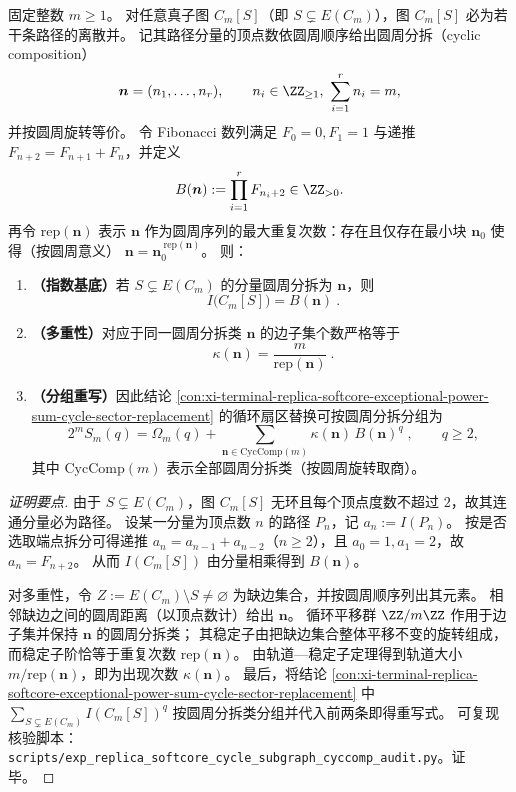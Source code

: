 \begin{conclusion}\label{con:xi-terminal-replica-softcore-cycle-subgraph-cyclic-composition-coeff-law}
固定整数 \(m\ge 1\)。
对任意真子图 \(C_m[S]\)（即 \(S\subsetneq E(C_m)\)），图 \(C_m[S]\) 必为若干条路径的离散并。
记其路径分量的顶点数依圆周顺序给出圆周分拆（cyclic composition）
\[
\boldsymbol n=(n_1,\dots,n_r),\qquad n_i\in\ZZ_{\ge 1},\ \sum_{i=1}^{r}n_i=m,
\]
并按圆周旋转等价。
令 Fibonacci 数列满足 \(F_0=0,F_1=1\) 与递推 \(F_{n+2}=F_{n+1}+F_n\)，并定义
\[
B(\boldsymbol n):=\prod_{i=1}^{r}F_{n_i+2}\in\ZZ_{>0}.
\]
再令 \(\mathrm{rep}(\boldsymbol n)\) 表示 \(\boldsymbol n\) 作为圆周序列的最大重复次数：存在且仅存在最小块 \(\boldsymbol n_0\) 使得（按圆周意义）
\(
\boldsymbol n=\boldsymbol n_0^{\ \mathrm{rep}(\boldsymbol n)}
\)。
则：
\begin{enumerate}
  \item \textbf{（指数基底）}若 \(S\subsetneq E(C_m)\) 的分量圆周分拆为 \(\boldsymbol n\)，则
  \[
  \boxed{\ I\!\bigl(C_m[S]\bigr)=B(\boldsymbol n)\ }.
  \]
  \item \textbf{（多重性）}对应于同一圆周分拆类 \(\boldsymbol n\) 的边子集个数严格等于
  \[
  \boxed{\ \kappa(\boldsymbol n)=\frac{m}{\mathrm{rep}(\boldsymbol n)}\ } .
  \]
  \item \textbf{（分组重写）}因此结论 \ref{con:xi-terminal-replica-softcore-exceptional-power-sum-cycle-sector-replacement} 的循环扇区替换可按圆周分拆分组为
  \[
  \boxed{\;
  2^m S_m(q)=\Omega_m(q)+\sum_{\boldsymbol n\in\mathrm{CycComp}(m)}\kappa(\boldsymbol n)\,B(\boldsymbol n)^{q}\; },
  \qquad q\ge 2,
  \]
  其中 \(\mathrm{CycComp}(m)\) 表示全部圆周分拆类（按圆周旋转取商）。
\end{enumerate}
\end{conclusion}
\begin{proof}[证明要点]
由于 \(S\subsetneq E(C_m)\)，图 \(C_m[S]\) 无环且每个顶点度数不超过 \(2\)，故其连通分量必为路径。
设某一分量为顶点数 \(n\) 的路径 \(P_n\)，记 \(a_n:=I(P_n)\)。
按是否选取端点拆分可得递推 \(a_n=a_{n-1}+a_{n-2}\)（\(n\ge 2\)），且 \(a_0=1,a_1=2\)，故 \(a_n=F_{n+2}\)。
从而 \(I(C_m[S])\) 由分量相乘得到 \(B(\boldsymbol n)\)。
\par
对多重性，令 \(Z:=E(C_m)\setminus S\neq\varnothing\) 为缺边集合，并按圆周顺序列出其元素。
相邻缺边之间的圆周距离（以顶点数计）给出 \(\boldsymbol n\)。
循环平移群 \(\ZZ/m\ZZ\) 作用于边子集并保持 \(\boldsymbol n\) 的圆周分拆类；
其稳定子由把缺边集合整体平移不变的旋转组成，而稳定子阶恰等于重复次数 \(\mathrm{rep}(\boldsymbol n)\)。
由轨道—稳定子定理得到轨道大小 \(m/\mathrm{rep}(\boldsymbol n)\)，即为出现次数 \(\kappa(\boldsymbol n)\)。
最后，将结论 \ref{con:xi-terminal-replica-softcore-exceptional-power-sum-cycle-sector-replacement} 中
\(\sum_{S\subsetneq E(C_m)}I(C_m[S])^{q}\)
按圆周分拆类分组并代入前两条即得重写式。
可复现核验脚本：\texttt{scripts/exp\_replica\_softcore\_cycle\_subgraph\_cyccomp\_audit.py}。证毕。
\end{proof}

